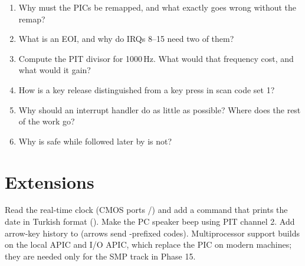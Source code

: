 \documentclass[11pt,a4paper]{article}
\begin{document}
\begin{questionbox}
\begin{enumerate}
  \item Why must the PICs be remapped, and what exactly goes wrong without the remap?
  \item What is an EOI, and why do IRQs 8--15 need two of them?
  \item Compute the PIT divisor for 1000\,Hz. What would that frequency cost, and what would it gain?
  \item How is a key release distinguished from a key press in scan code set 1?
  \item Why should an interrupt handler do as little as possible? Where does the rest of the work go?
  \item Why is  safe while  followed later by  is not?
\end{enumerate}
\end{questionbox}

\section{Extensions}

Read the real-time clock (CMOS ports /) and add a  command that prints the date in
Turkish format (). Make the PC speaker beep using PIT channel 2. Add arrow-key history to
 (arrows send -prefixed codes). Multiprocessor support builds on the local APIC and I/O APIC, which replace the PIC on modern machines; they are
needed only for the SMP track in Phase 15.

\booklegend
\end{document}
